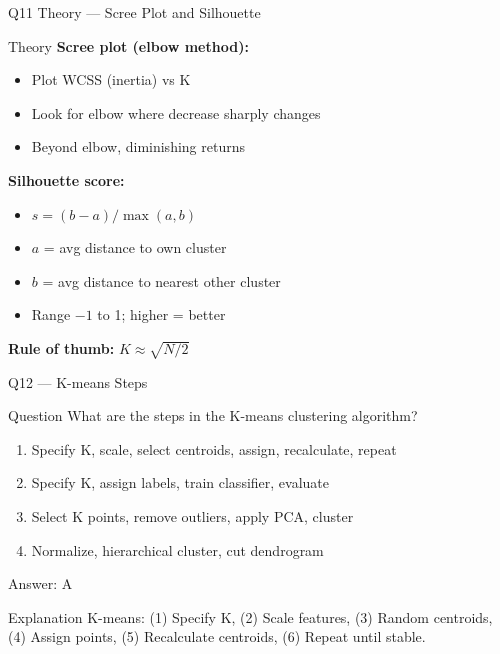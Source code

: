 \documentclass[aspectratio=169,8pt]{beamer}
\begin{document}
	\begin{frame}{Q11 Theory --- Scree Plot and Silhouette}
		\begin{block}{Theory}
			\textbf{Scree plot (elbow method):}
			\begin{itemize}
				\item Plot WCSS (inertia) vs K
				\item Look for elbow where decrease sharply changes
				\item Beyond elbow, diminishing returns
			\end{itemize}
			\textbf{Silhouette score:}
			\begin{itemize}
				\item $s = (b - a) / \max(a, b)$
				\item $a$ = avg distance to own cluster
				\item $b$ = avg distance to nearest other cluster
				\item Range $-1$ to 1; higher = better
			\end{itemize}
			\textbf{Rule of thumb:} $K \approx \sqrt{N/2}$
		\end{block}
	\end{frame}
	
	\begin{frame}{Q12 --- K-means Steps}
		\begin{block}{Question}
			What are the steps in the K-means clustering algorithm?
		\end{block}
		\begin{enumerate}[label=\Alph*.]
			\item Specify K, scale, select centroids, assign, recalculate, repeat
			\item Specify K, assign labels, train classifier, evaluate
			\item Select K points, remove outliers, apply PCA, cluster
			\item Normalize, hierarchical cluster, cut dendrogram
		\end{enumerate}
		\begin{exampleblock}{Answer: A}
		\end{exampleblock}
		\begin{block}{Explanation}
			K-means: (1) Specify K, (2) Scale features, (3) Random centroids, (4) Assign points, (5) Recalculate centroids, (6) Repeat until stable.
		\end{block}
	\end{frame}
	
\end{document}
